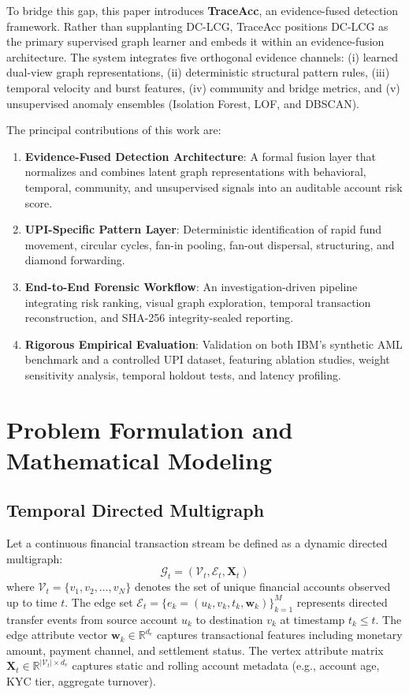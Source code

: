 \documentclass[journal]{IEEEtran}
\begin{document}
To bridge this gap, this paper introduces \textbf{TraceAcc}, an evidence-fused detection framework. Rather than supplanting DC-LCG, TraceAcc positions DC-LCG as the primary supervised graph learner and embeds it within an evidence-fusion architecture. The system integrates five orthogonal evidence channels: (i) learned dual-view graph representations, (ii) deterministic structural pattern rules, (iii) temporal velocity and burst features, (iv) community and bridge metrics, and (v) unsupervised anomaly ensembles (Isolation Forest, LOF, and DBSCAN).

The principal contributions of this work are:
\begin{enumerate}
    \item \textbf{Evidence-Fused Detection Architecture}: A formal fusion layer that normalizes and combines latent graph representations with behavioral, temporal, community, and unsupervised signals into an auditable account risk score.
    \item \textbf{UPI-Specific Pattern Layer}: Deterministic identification of rapid fund movement, circular cycles, fan-in pooling, fan-out dispersal, structuring, and diamond forwarding.
    \item \textbf{End-to-End Forensic Workflow}: An investigation-driven pipeline integrating risk ranking, visual graph exploration, temporal transaction reconstruction, and SHA-256 integrity-sealed reporting.
    \item \textbf{Rigorous Empirical Evaluation}: Validation on both IBM's synthetic AML benchmark \cite{altman2023realistic} and a controlled UPI dataset, featuring ablation studies, weight sensitivity analysis, temporal holdout tests, and latency profiling.
\end{enumerate}

\section{Problem Formulation and Mathematical Modeling}
\label{sec:formulation}

\subsection{Temporal Directed Multigraph}
Let a continuous financial transaction stream be defined as a dynamic directed multigraph:
\begin{equation}
\mathcal{G}_t = (\mathcal{V}_t, \mathcal{E}_t, \mathbf{X}_t)
\end{equation}
where $\mathcal{V}_t = \{v_1, v_2, \dots, v_N\}$ denotes the set of unique financial accounts observed up to time $t$. The edge set $\mathcal{E}_t = \{e_k = (u_k, v_k, t_k, \mathbf{w}_k)\}_{k=1}^M$ represents directed transfer events from source account $u_k$ to destination $v_k$ at timestamp $t_k \le t$. The edge attribute vector $\mathbf{w}_k \in \mathbb{R}^{d_e}$ captures transactional features including monetary amount, payment channel, and settlement status. The vertex attribute matrix $\mathbf{X}_t \in \mathbb{R}^{|\mathcal{V}_t| \times d_v}$ captures static and rolling account metadata (e.g., account age, KYC tier, aggregate turnover).
\end{document}
